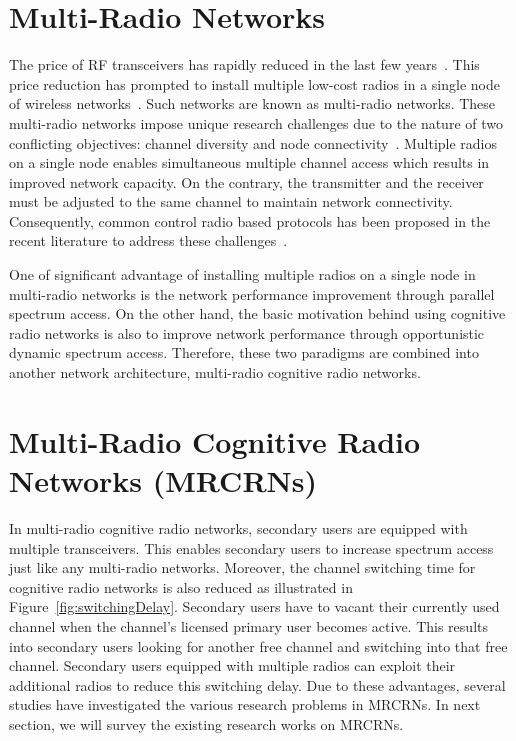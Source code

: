 \section{Multi-Radio Networks}

The price of RF transceivers has rapidly reduced in the last few years~\cite{gutierrez2001ieee}. This price reduction has prompted to install multiple low-cost radios in a single node of wireless networks~\cite{raniwala2005architecture}. Such networks are known as multi-radio networks. These multi-radio networks impose unique research challenges due to the nature of two conflicting objectives: channel diversity and node connectivity~\cite{wang2007survey}. Multiple radios on a single node enables simultaneous multiple channel access which results in improved network capacity. On the contrary, the transmitter and the receiver must be adjusted to the same channel to maintain network connectivity. Consequently, common control radio based protocols has been proposed in the recent literature to address these challenges~\cite{ko2007distributed, al2016channel, gabale2013classification, kyasanur2006routing, chatterjee2013low}.

One of significant advantage of installing multiple radios on a single node in multi-radio networks is the network performance improvement through parallel spectrum access. On the other hand, the basic motivation behind using cognitive radio networks is also to improve network performance through opportunistic dynamic spectrum access. Therefore, these two paradigms are combined into another network architecture, multi-radio cognitive radio networks. 

\section{Multi-Radio Cognitive Radio Networks (MRCRNs)}
In multi-radio cognitive radio networks, secondary users are equipped with multiple transceivers. This enables secondary users to increase spectrum access just like any multi-radio networks. Moreover, the channel switching time for cognitive radio networks is also reduced as illustrated in Figure~\ref{fig:switchingDelay}. Secondary users have to vacant their currently used channel when the channel's licensed primary user becomes active. This results into secondary users looking for another free channel and switching into that free channel. Secondary users equipped with multiple radios can exploit their additional radios to reduce this switching delay. Due to these advantages, several studies have investigated the various research problems in MRCRNs. In next section, we will survey the existing research works on MRCRNs.

